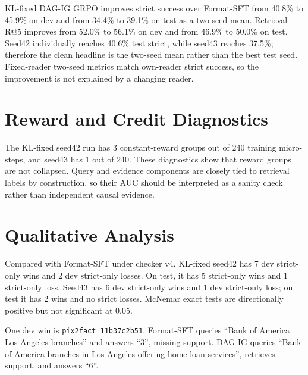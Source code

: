 \documentclass[11pt]{article}
\begin{document}
\begin{table}[t]
\centering

\caption{Main two-stage offline Pix2Fact results. Strict success requires answer correctness and evidence support.}
\label{tab:main}
\end{table}

KL-fixed DAG-IG GRPO improves strict success over Format-SFT from 40.8\% to 45.9\% on dev and from 34.4\% to 39.1\% on test as a two-seed mean. Retrieval R@5 improves from 52.0\% to 56.1\% on dev and from 46.9\% to 50.0\% on test. Seed42 individually reaches 40.6\% test strict, while seed43 reaches 37.5\%; therefore the clean headline is the two-seed mean rather than the best test seed. Fixed-reader two-seed metrics match own-reader strict success, so the improvement is not explained by a changing reader.

\section{Reward and Credit Diagnostics}

\begin{table}[t]
\centering

\caption{Reward audit over GRPO rollout groups. DAG-IG reward is predictive of retrieval hit and strict success, and constant-reward groups are rare.}
\label{tab:reward}
\end{table}

The KL-fixed seed42 run has 3 constant-reward groups out of 240 training micro-steps, and seed43 has 1 out of 240. These diagnostics show that reward groups are not collapsed. Query and evidence components are closely tied to retrieval labels by construction, so their AUC should be interpreted as a sanity check rather than independent causal evidence.

\section{Qualitative Analysis}

Compared with Format-SFT under checker v4, KL-fixed seed42 has 7 dev strict-only wins and 2 dev strict-only losses. On test, it has 5 strict-only wins and 1 strict-only loss. Seed43 has 6 dev strict-only wins and 1 dev strict-only loss; on test it has 2 wins and no strict losses. McNemar exact tests are directionally positive but not significant at 0.05.

One dev win is \texttt{pix2fact\_11b37c2b51}. Format-SFT queries ``Bank of America Los Angeles branches'' and answers ``3'', missing support. DAG-IG queries ``Bank of America branches in Los Angeles offering home loan services'', retrieves support, and answers ``6''.
\end{document}
